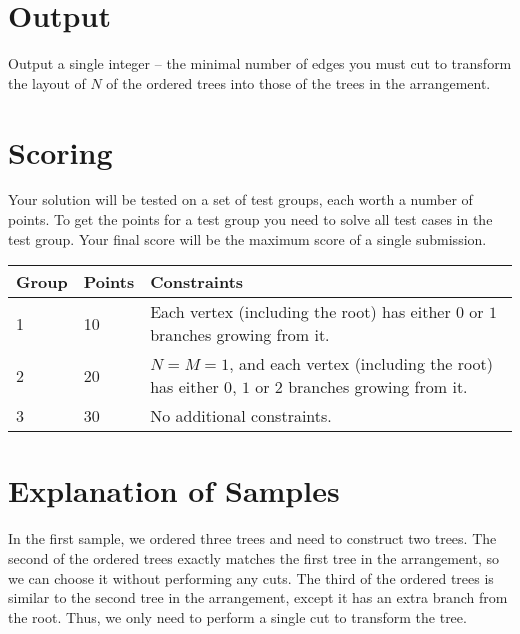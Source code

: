 \section*{Output}
Output a single integer -- the minimal number of edges you must cut to transform the layout of $N$ of the ordered trees into those of the trees in the arrangement.

\section*{Scoring}
Your solution will be tested on a set of test groups, each worth a number of points.
To get the points for a test group you need to solve all test cases in the test group.
Your final score will be the maximum score of a single submission.

\noindent
\begin{tabular}{| l | l | p{10cm} |}
\hline
Group & Points & Constraints \\ \hline
1     & 10     & Each vertex (including the root) has either $0$ or $1$ branches growing from it.  \\ \hline
2     & 20     & $N = M = 1$, and each vertex (including the root) has either $0$, $1$ or $2$ branches growing from it.  \\ \hline
3     & 30     & No additional constraints. \\ \hline
\end{tabular}

\section*{Explanation of Samples}
In the first sample, we ordered three trees and need to construct two trees.
The second of the ordered trees exactly matches the first tree in the arrangement, so we can choose it without performing any cuts.
The third of the ordered trees is similar to the second tree in the arrangement, except it has an extra branch from the root.
Thus, we only need to perform a single cut to transform the tree.
